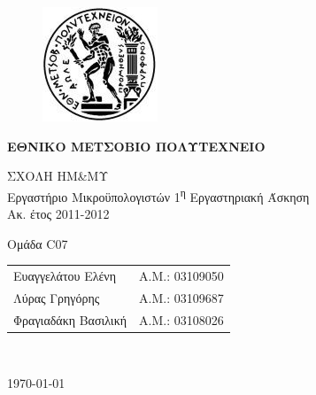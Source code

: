 \begin{titlepage}
\begin{center}
\begin{figure}[t] 
     \includegraphics[scale=0.7]{title/ntua_logo}
\end{figure}
\begin{LARGE}\textbf{ΕΘΝΙΚΟ ΜΕΤΣΟΒΙΟ ΠΟΛΥΤΕΧΝΕΙΟ\\}\end{LARGE}
\vspace{2cm}
\begin{Large}
ΣΧΟΛΗ ΗΜ\&ΜΥ\\
Εργαστήριο Μικροϋπολογιστών
1\textsuperscript{η} Εργαστηριακή Άσκηση\\
Ακ. έτος 2011-2012\\
\end{Large}
\vspace{5cm}
\Large Ομάδα C07\\
\vspace{1cm}
\begin{tabular}{l r}
\Large{Ευαγγελάτου Ελένη}&
\large{Α.Μ.: 03109050}\\
\Large{Λύρας Γρηγόρης}&
\large{Α.Μ.: 03109687}\\
\Large{Φραγιαδάκη Βασιλική}&
\large{Α.Μ.: 03108026}\\
\end{tabular}\\
\vspace{5cm}

\vfill
\large\today\\
\end{center}
\end{titlepage}

